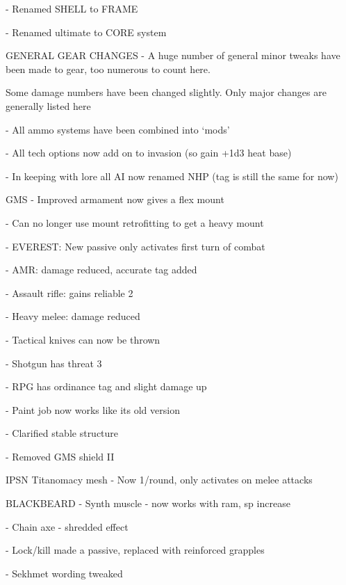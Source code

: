     -    Renamed SHELL to FRAME
 
    -    Renamed ultimate to CORE system
 

GENERAL GEAR CHANGES  
    -    A huge number of general minor tweaks have been made to gear, too numerous to count here.  

         Some damage numbers have been changed slightly. Only major changes are generally listed here
 
    -    All ammo systems have been combined into ‘mods'
 
    -    All tech options now add on to invasion (so gain +1d3 heat base)
 

    -    In keeping with lore all AI now renamed NHP (tag is still the same for now)
 

GMS  
    -    Improved armament now gives a flex mount
 
    -    Can no longer use mount retrofitting to get a heavy mount
 
    -    EVEREST: New passive only activates first turn of combat
 

    -    AMR: damage reduced, accurate tag added
 
    -    Assault rifle: gains reliable 2
 
    -    Heavy melee: damage reduced
 

    -    Tactical knives can now be thrown
 
    -    Shotgun has threat 3
 
    -    RPG has ordinance tag and slight damage up
 

    -    Paint job now works like its old version
 
    -    Clarified stable structure
 
    -    Removed GMS shield II
 

                                                                                                                         


                                                        IPSN  
Titanomacy mesh - Now 1/round, only activates on melee attacks
 

BLACKBEARD  
    -    Synth muscle - now works with ram, sp increase
 
    -    Chain axe - shredded effect
 
    -    Lock/kill made a passive, replaced with reinforced grapples
 

    -    Sekhmet wording tweaked
 
